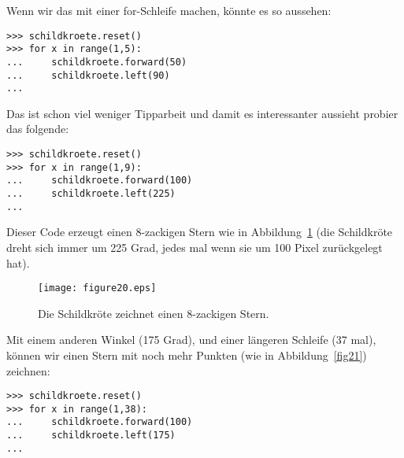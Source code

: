 \noindent
Wenn wir das mit einer for-Schleife machen, könnte es so aussehen:

\begin{Verbatim}[frame=single]
>>> schildkroete.reset()
>>> for x in range(1,5):
...     schildkroete.forward(50)
...     schildkroete.left(90)
...
\end{Verbatim}

Das ist schon viel weniger Tipparbeit und damit es interessanter aussieht probier das folgende:

\begin{Verbatim}[frame=single]
>>> schildkroete.reset()
>>> for x in range(1,9):
...     schildkroete.forward(100)
...     schildkroete.left(225)
...
\end{Verbatim}

Dieser Code erzeugt einen 8-zackigen Stern wie in Abbildung~\ref{fig20} (die Schildkröte dreht sich immer um 225 Grad, jedes mal wenn sie um 100 Pixel zurückgelegt hat).

\begin{figure}
\begin{center}
\texttt{[image: figure20.eps]}
\end{center}
\caption{Die Schildkröte zeichnet einen 8-zackigen Stern.}\label{fig20}
\end{figure}

\noindent
Mit einem anderen Winkel (175 Grad), und einer längeren Schleife (37 mal), können wir einen Stern mit noch mehr Punkten (wie in Abbildung~\ref{fig21}) zeichnen:

\begin{Verbatim}[frame=single]
>>> schildkroete.reset()
>>> for x in range(1,38):
...     schildkroete.forward(100)
...     schildkroete.left(175)
...
\end{Verbatim}

